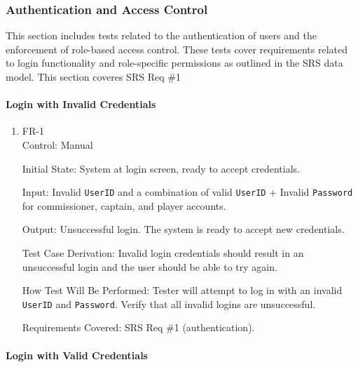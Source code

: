 \documentclass[12pt, titlepage]{article}
\begin{document}
\subsubsection{Authentication and Access Control}

This section includes tests related to the authentication of users and the enforcement of role-based access control. These tests cover requirements related to login functionality and role-specific permissions as outlined in the SRS data model. This section coveres SRS Req \#1

\paragraph{Login with Invalid Credentials}

\begin{enumerate}
  \item{FR-1\\}
        Control: Manual

        Initial State: System at login screen, ready to accept credentials.

        Input: Invalid \texttt{UserID} and a combination of valid \texttt{UserID} + Invalid \texttt{Password} for commissioner, captain, and player accounts.

        Output: Unsuccessful login. The system is ready to accept new credentials.

        Test Case Derivation: Invalid login credentials should result in an unsuccessful login and the user should be able to try again.

        How Test Will Be Performed: Tester will attempt to log in with an invalid \texttt{UserID} and \texttt{Password}. Verify that all invalid logins are unsuccessful.

        Requirements Covered: SRS Req \#1 (authentication).
\end{enumerate}

\paragraph{Login with Valid Credentials}
\end{document}
